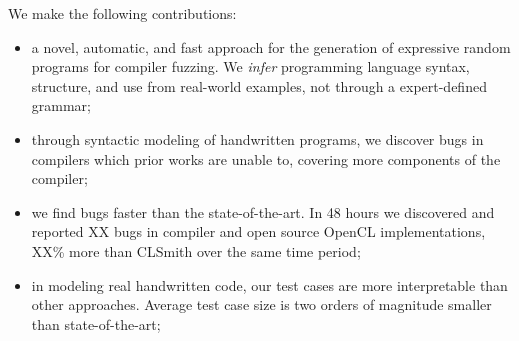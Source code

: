We make the following contributions:
%
\begin{itemize}
\item a novel, automatic, and fast approach for the generation of expressive random programs for compiler fuzzing. We \emph{infer} programming language syntax, structure, and use from real-world examples, not through a expert-defined grammar; %
\item through syntactic modeling of handwritten programs, we discover bugs in compilers which prior works are unable to, covering more components of the compiler;
\item we find bugs faster than the state-of-the-art. In 48 hours we discovered and reported XX bugs in compiler and open source OpenCL implementations, XX\% more than CLSmith over the same time period;
\item in modeling real handwritten code, our test cases are more interpretable than other approaches. Average test case size is two orders of magnitude smaller than state-of-the-art;
\end{itemize}
